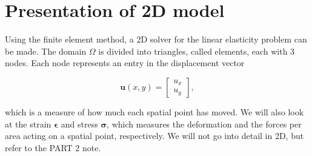 \section{Presentation of 2D model}

Using the finite element method, a 2D solver for the linear elasticity problem can be made. The domain $\Omega$ is divided into triangles, called elements, each with 3 nodes. Each node represents an entry in the displacement vector

\begin{equation}
\bm{u}(x,y) = 
\begin{bmatrix}
u_x \\
u_y
\end{bmatrix},
\end{equation}

which is a measure of how much each spatial point has moved.  We will also look at the strain $\bm{\epsilon}$ and stress $\bm{\sigma}$, which measures the deformation and the forces per area acting on a spatial point, respectively. We will not go into detail in 2D, but refer to the PART 2 note.



